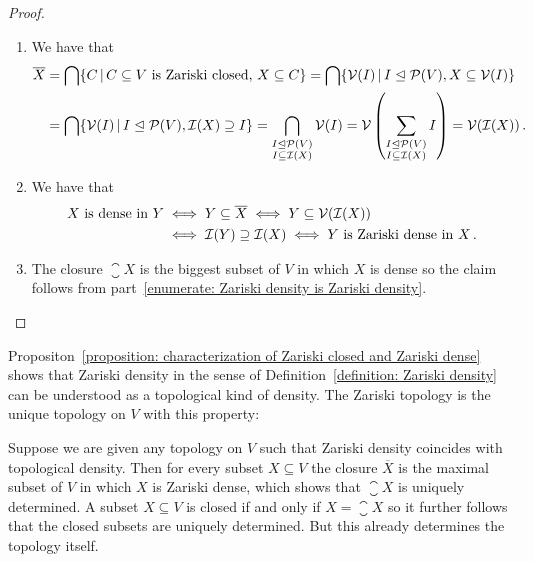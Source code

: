 \begin{proof}
  \leavevmode
  \begin{enumerate}
    \item
      We have that
      \begin{align*}
            \closure{X}
        &=  \bigcap \{ C \suchthat \text{$C \subseteq V$ is Zariski closed, $X \subseteq C$} \}
         =  \bigcap \{ \mc{V}(I) \suchthat I \idealleq \mc{P}(V), X \subseteq \mc{V}(I) \} \\
        &=  \bigcap \{ \mc{V}(I) \suchthat I \idealleq \mc{P}(V), \mc{I}(X) \supseteq I \}
         =  \bigcap_{\substack{I \idealleq \mc{P}(V) \\ I \subseteq \mc{I}(X)}} \mc{V}(I)
         =  \mc{V}\left( \sum_{\substack{I \idealleq \mc{P}(V) \\ I \subseteq \mc{I}(X)}} I \right)
         =  \mc{V}(\mc{I}(X)) \,.
      \end{align*}
    \item
      We have that
      \begin{align*}
              \text{$X$ is dense in $Y$}
        &\iff Y \subseteq \overline{X}
         \iff Y \subseteq \mathcal{V}(\mathcal{I}(X)) \\
        &\iff \mathcal{I}(Y) \supseteq \mathcal{I}(X)
         \iff \text{$Y$ is Zariski dense in $X$} \,.
      \end{align*}
    \item
      The closure $\closure{X}$ is the biggest subset of $V$ in which $X$ is dense so the claim follows from part~\ref*{enumerate: Zariski density is Zariski density}.
    \qedhere
  \end{enumerate}
\end{proof}


\begin{remark}
  Propositon~\ref{proposition: characterization of Zariski closed and Zariski dense} shows that Zariski density in the sense of Definition~\ref{definition: Zariski density} can be understood as a topological kind of density.
  The Zariski topology is the unique topology on $V$ with this property:
  
  Suppose we are given any topology on $V$ such that Zariski density coincides with topological density.
  Then for every subset $X \subseteq V$ the closure $\overline{X}$ is the maximal subset of $V$ in which $X$ is Zariski dense, which shows that $\closure{X}$ is uniquely determined.
  A subset $X \subseteq V$ is closed if and only if $X = \closure{X}$ so it further follows that the closed subsets are uniquely determined.
  But this already determines the topology itself.
\end{remark}


